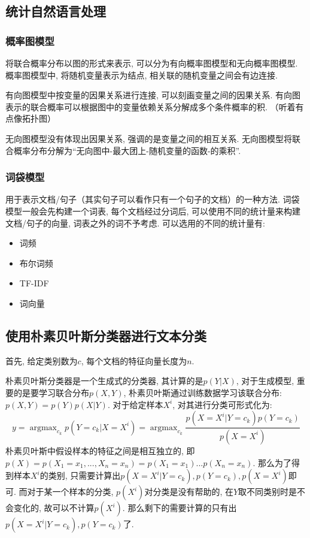\subsection{统计自然语言处理}



\subsubsection{概率图模型}
将联合概率分布以图的形式来表示, 可以分为有向概率图模型和无向概率图模型. 
概率图模型中, 将随机变量表示为结点, 相关联的随机变量之间会有边连接. 

有向图模型中按变量的因果关系进行连接, 可以刻画变量之间的因果关系. 有向图表示的联合概率可以根据图中的变量依赖关系分解成多个条件概率的积. （听着有点像拓扑图）

无向图模型没有体现出因果关系, 强调的是变量之间的相互关系. 无向图模型将联合概率分布分解为“无向图中-最大团上-随机变量的函数-的乘积”. 





\subsubsection{词袋模型}
用于表示文档/句子（其实句子可以看作只有一个句子的文档）的一种方法. 
词袋模型一般会先构建一个词表, 每个文档经过分词后, 可以使用不同的统计量来构建文档/句子的向量, 词表之外的词不予考虑. 可以选用的不同的统计量有: 
\begin{itemize}
	\item 词频
	\item 布尔词频
	\item TF-IDF
	\item 词向量
\end{itemize}

\subsection{使用朴素贝叶斯分类器进行文本分类}
首先, 给定类别数为$c$, 每个文档的特征向量长度为$n$. 

朴素贝叶斯分类器是一个生成式的分类器, 其计算的是$p(Y | X)$, 对于生成模型, 重要的是要学习联合分布$p(X, Y)$, 朴素贝叶斯通过训练数据学习该联合分布: $p(X, Y) = p(Y)p(X|Y)$. 对于给定样本$X^i$, 对其进行分类可形式化为: 
$$
y = \mathop{argmax}_{c_k} p(Y=c_k | X=X^i) = \mathop{argmax}_{c_k} \frac{p(X=X^i | Y=c_k) p(Y=c_k)}{p(X=X^i)}
$$
朴素贝叶斯中假设样本的特征之间是相互独立的, 即$p(X)=p(X_1=x_1, ..., X_n=x_n) = p(X_1=x_1) ... p(X_n=x_n)$. 那么为了得到样本$X^i$的类别, 只需要计算出$p(X=X^i | Y=c_k),  p(Y=c_k), p(X=X^i)$即可. 而对于某一个样本的分类, $p(X^i)$对分类是没有帮助的, 在$Y$取不同类别时是不会变化的, 故可以不计算$p(X^i)$. 那么剩下的需要计算的只有出$p(X=X^i | Y=c_k),  p(Y=c_k)$了. 

